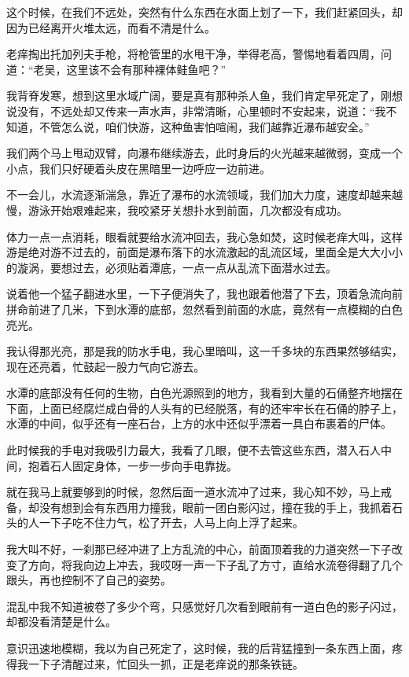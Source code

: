 这个时候，在我们不远处，突然有什么东西在水面上划了一下，我们赶紧回头，却因为已经离开火堆太远，而看不清是什么。

老痒掏出托加列夫手枪，将枪管里的水甩干净，举得老高，警惕地看着四周，问道：“老吴，这里该不会有那种裸体鲑鱼吧？”

我背脊发寒，想到这里水域广阔，要是真有那种杀人鱼，我们肯定早死定了，刚想说没有，不远处却又传来一声水声，非常清晰，心里顿时不安起来，说道：“我不知道，不管怎么说，咱们快游，这种鱼害怕喧闹，我们越靠近瀑布越安全。”

我们两个马上甩动双臂，向瀑布继续游去，此时身后的火光越来越微弱，变成一个小点，我们只好硬着头皮在黑暗里一边呼应一边前进。

不一会儿，水流逐渐湍急，靠近了瀑布的水流领域，我们加大力度，速度却越来越慢，游泳开始艰难起来，我咬紧牙关想扑水到前面，几次都没有成功。

体力一点一点消耗，眼看就要给水流冲回去，我心急如焚，这时候老痒大叫，这样游是绝对游不过去的，前面是瀑布落下的水流激起的乱流区域，里面全是大大小小的漩涡，要想过去，必须贴着潭底，一点一点从乱流下面潜水过去。

说着他一个猛子翻进水里，一下子便消失了，我也跟着他潜了下去，顶着急流向前拼命前进了几米，下到水潭的底部，忽然看到前面的水底，竟然有一点模糊的白色亮光。

我认得那光亮，那是我的防水手电，我心里暗叫，这一千多块的东西果然够结实，现在还亮着，忙鼓起一股力气向它游去。

水潭的底部没有任何的生物，白色光源照到的地方，我看到大量的石俑整齐地摆在下面，上面已经腐烂成白骨的人头有的已经脱落，有的还牢牢长在石俑的脖子上，水潭的中间，似乎还有一座石台，上方的水中还似乎漂着一具白布裹着的尸体。

此时候我的手电对我吸引力最大，我看了几眼，便不去管这些东西，潜入石人中间，抱着石人固定身体，一步一步向手电靠拢。

就在我马上就要够到的时候，忽然后面一道水流冲了过来，我心知不妙，马上戒备，却没有想到会有东西用力撞我，眼前一团白影闪过，撞在我的手上，我抓着石头的人一下子吃不住力气，松了开去，人马上向上浮了起来。

我大叫不好，一刹那已经冲进了上方乱流的中心，前面顶着我的力道突然一下子改变了方向，将我向边上冲去，我哎呀一声一下子乱了方寸，直给水流卷得翻了几个跟头，再也控制不了自己的姿势。

混乱中我不知道被卷了多少个弯，只感觉好几次看到眼前有一道白色的影子闪过，却都没看清楚是什么。

意识迅速地模糊，我以为自己死定了，这时候，我的后背猛撞到一条东西上面，疼得我一下子清醒过来，忙回头一抓，正是老痒说的那条铁链。

